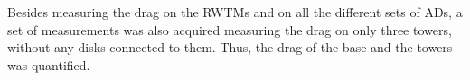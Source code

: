Besides measuring the drag on the \gls{RWTM}s and on all the different sets of \gls{AD}s, a set of measurements was also acquired measuring the drag on only three towers, without any disks connected to them. Thus, the drag of the base and the towers was quantified. 


